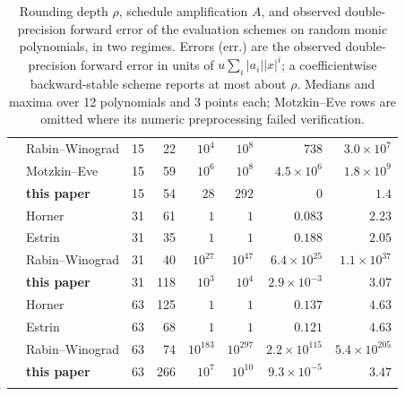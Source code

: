 \begin{table}[htbp]
\begin{tabular}{@{}llrrrrrr@{}}
 & Rabin--Winograd & 15 & 22 & $10^{4}$ & $10^{8}$ & $738$ & $3.0\times10^{7}$ \\
 & Motzkin--Eve & 15 & 59 & $10^{6}$ & $10^{8}$ & $4.5\times10^{6}$ & $1.8\times10^{9}$ \\
 & \textbf{this paper} & 15 & 54 & $28$ & $292$ & $0$ & $1.4$ \\
\addlinespace[2pt]
 & Horner & 31 & 61 & $1$ & $1$ & $0.083$ & $2.23$ \\
 & Estrin & 31 & 35 & $1$ & $1$ & $0.188$ & $2.05$ \\
 & Rabin--Winograd & 31 & 40 & $10^{27}$ & $10^{47}$ & $6.4\times10^{25}$ & $1.1\times10^{37}$ \\
 & \textbf{this paper} & 31 & 118 & $10^{3}$ & $10^{4}$ & $2.9\times10^{-3}$ & $3.07$ \\
\addlinespace[2pt]
 & Horner & 63 & 125 & $1$ & $1$ & $0.137$ & $4.63$ \\
 & Estrin & 63 & 68 & $1$ & $1$ & $0.121$ & $4.63$ \\
 & Rabin--Winograd & 63 & 74 & $10^{183}$ & $10^{297}$ & $2.2\times10^{115}$ & $5.4\times10^{205}$ \\
 & \textbf{this paper} & 63 & 266 & $10^{7}$ & $10^{10}$ & $9.3\times10^{-5}$ & $3.47$ \\
\addlinespace[2pt]
\bottomrule
\end{tabular}
\caption{Rounding depth $\rho$, schedule amplification $A$, and observed double-precision forward error of the evaluation schemes on random monic polynomials, in two regimes. Errors (err.) are the observed double-precision forward error in units of $u\sum_i|a_i||x|^i$; a coefficientwise backward-stable scheme reports at most about $\rho$. Medians and maxima over 12 polynomials and 3 points each; Motzkin--Eve rows are omitted where its numeric preprocessing failed verification.}
\label{tab:numstab}
\end{table}
